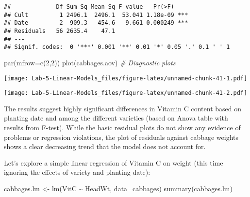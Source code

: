 \documentclass[
]{article}
\newenvironment{Shaded}{\begin{snugshade}}{\end{snugshade}}
\newcommand{\AttributeTok}[1]{\textcolor[rgb]{0.77,0.63,0.00}{#1}}
\newcommand{\CommentTok}[1]{\textcolor[rgb]{0.56,0.35,0.01}{\textit{#1}}}
\newcommand{\DecValTok}[1]{\textcolor[rgb]{0.00,0.00,0.81}{#1}}
\newcommand{\FunctionTok}[1]{\textcolor[rgb]{0.00,0.00,0.00}{#1}}
\newcommand{\NormalTok}[1]{#1}
\newcommand{\OtherTok}[1]{\textcolor[rgb]{0.56,0.35,0.01}{#1}}
\newcommand{\SpecialCharTok}[1]{\textcolor[rgb]{0.00,0.00,0.00}{#1}}
\begin{document}
\begin{verbatim}
##             Df Sum Sq Mean Sq F value   Pr(>F)    
## Cult         1 2496.1  2496.1  53.041 1.18e-09 ***
## Date         2  909.3   454.6   9.661 0.000249 ***
## Residuals   56 2635.4    47.1                     
## ---
## Signif. codes:  0 '***' 0.001 '**' 0.01 '*' 0.05 '.' 0.1 ' ' 1
\end{verbatim}

\begin{Shaded}
\begin{Highlighting}[]
\FunctionTok{par}\NormalTok{(}\AttributeTok{mfrow=}\FunctionTok{c}\NormalTok{(}\DecValTok{2}\NormalTok{,}\DecValTok{2}\NormalTok{))}
\FunctionTok{plot}\NormalTok{(cabbages.aov) }\CommentTok{\# Diagnostic plots}
\end{Highlighting}
\end{Shaded}

\texttt{[image: Lab-5-Linear-Models\_files/figure-latex/unnamed-chunk-41-1.pdf]}

\begin{Shaded}
\end{Shaded}

\texttt{[image: Lab-5-Linear-Models\_files/figure-latex/unnamed-chunk-41-2.pdf]}

The results suggest highly significant differences in Vitamin C content
based on planting date and among the different varieties (based on Anova
table with results from F-test). While the basic residual plots do not
show any evidence of problems or regression violations, the plot of
residuals against cabbage weights shows a clear decreasing trend that
the model does not account for.

Let's explore a simple linear regression of Vitamin C on weight (this
time ignoring the effects of variety and planting date):

\begin{Shaded}
\begin{Highlighting}[]
\NormalTok{cabbages.lm }\OtherTok{\textless{}{-}} \FunctionTok{lm}\NormalTok{(VitC }\SpecialCharTok{\textasciitilde{}}\NormalTok{ HeadWt, }\AttributeTok{data=}\NormalTok{cabbages)}
\FunctionTok{summary}\NormalTok{(cabbages.lm)}
\end{Highlighting}
\end{Shaded}
\end{document}
